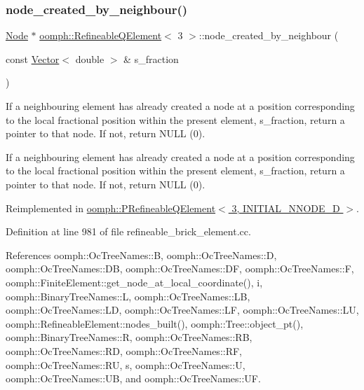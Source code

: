 \mbox{\label{classoomph_1_1RefineableQElement_3_013_01_4_a3651ba128941c12c7da6521ae82af8ff}} 
\subsubsection{\texorpdfstring{node\+\_\+created\+\_\+by\+\_\+neighbour()}{node\_created\_by\_neighbour()}}
{\footnotesize\ttfamily \hyperlink{classoomph_1_1Node}{Node} $\ast$ \hyperlink{classoomph_1_1RefineableQElement}{oomph\+::\+Refineable\+Q\+Element}$<$ 3 $>$\+::node\+\_\+created\+\_\+by\+\_\+neighbour (\begin{DoxyParamCaption}\item[{const \hyperlink{classoomph_1_1Vector}{Vector}$<$ double $>$ \&}]{s\+\_\+fraction }\end{DoxyParamCaption})\hspace{0.3cm}{\ttfamily [virtual]}}



If a neighbouring element has already created a node at a position corresponding to the local fractional position within the present element, s\+\_\+fraction, return a pointer to that node. If not, return N\+U\+LL (0). 

If a neighbouring element has already created a node at a position corresponding to the local fractional position within the present element, s\+\_\+fraction, return a pointer to that node. If not, return N\+U\+LL (0). 

Reimplemented in \hyperlink{classoomph_1_1PRefineableQElement_3_013_00_01INITIAL__NNODE__1D_01_4_a4dde880cb5445319e81552bd152d39a1}{oomph\+::\+P\+Refineable\+Q\+Element$<$ 3, I\+N\+I\+T\+I\+A\+L\+\_\+\+N\+N\+O\+D\+E\+\_\+D $>$}.



Definition at line 981 of file refineable\+\_\+brick\+\_\+element.\+cc.



References oomph\+::\+Oc\+Tree\+Names\+::B, oomph\+::\+Oc\+Tree\+Names\+::D, oomph\+::\+Oc\+Tree\+Names\+::\+DB, oomph\+::\+Oc\+Tree\+Names\+::\+DF, oomph\+::\+Oc\+Tree\+Names\+::F, oomph\+::\+Finite\+Element\+::get\+\_\+node\+\_\+at\+\_\+local\+\_\+coordinate(), i, oomph\+::\+Binary\+Tree\+Names\+::L, oomph\+::\+Oc\+Tree\+Names\+::\+LB, oomph\+::\+Oc\+Tree\+Names\+::\+LD, oomph\+::\+Oc\+Tree\+Names\+::\+LF, oomph\+::\+Oc\+Tree\+Names\+::\+LU, oomph\+::\+Refineable\+Element\+::nodes\+\_\+built(), oomph\+::\+Tree\+::object\+\_\+pt(), oomph\+::\+Binary\+Tree\+Names\+::R, oomph\+::\+Oc\+Tree\+Names\+::\+RB, oomph\+::\+Oc\+Tree\+Names\+::\+RD, oomph\+::\+Oc\+Tree\+Names\+::\+RF, oomph\+::\+Oc\+Tree\+Names\+::\+RU, s, oomph\+::\+Oc\+Tree\+Names\+::U, oomph\+::\+Oc\+Tree\+Names\+::\+UB, and oomph\+::\+Oc\+Tree\+Names\+::\+UF.

